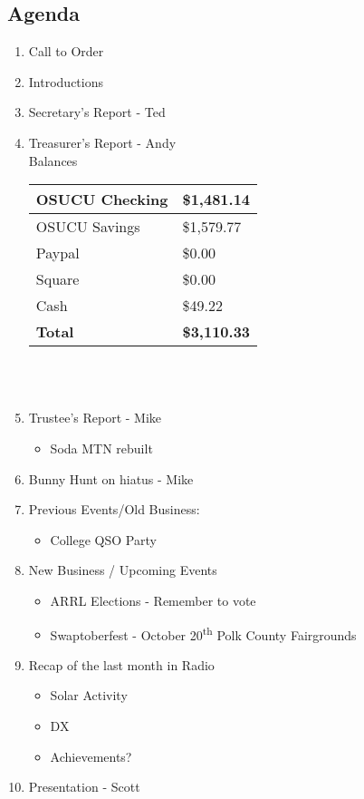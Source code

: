 \documentclass[letter,11pt]{extarticle}
\begin{document}
	\subsection*{Agenda}
	\begin{enumerate}
		\item Call to Order
		\item Introductions
		\item Secretary's Report - Ted
		\item Treasurer's Report - Andy \\
				Balances 
			\begin{tabular}{|l|l|} \hline
				OSUCU Checking & \$1,481.14 \\ \hline
				OSUCU Savings & \$1,579.77 \\ \hline
				Paypal & \$0.00 \\ \hline
				Square & \$0.00 \\ \hline
				Cash & \$49.22 \\ \hline
				\textbf{Total} & \textbf{\$3,110.33} \\ \hline
			\end{tabular} \\ \\
		\item Trustee's Report - Mike
			\begin{itemize}
				\item Soda MTN rebuilt
			\end{itemize}
		\item Bunny Hunt on hiatus - Mike
		\item Previous Events/Old Business:
		\begin{itemize}
			\item College QSO Party
		\end{itemize}
				
		\item  New Business / Upcoming Events
			\begin{itemize}
				\item ARRL Elections - Remember to vote
				\item Swaptoberfest - October 20\textsuperscript{th} Polk County Fairgrounds
			\end{itemize}
		\item Recap of the last month in Radio
			\begin{itemize}
				\item Solar Activity
				\item DX
				\item Achievements?
			\end{itemize}
		\item  Presentation - Scott
	\end{enumerate}
\end{document}
